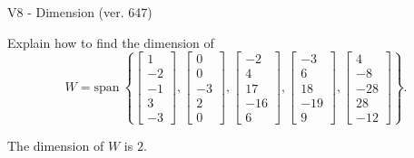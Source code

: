 \begin{exercise}
  \begin{exerciseTitle}V8 - Dimension (ver. 647)\end{exerciseTitle}
  \begin{exerciseStatement}
    Explain how to find the dimension of 
\[W=\mathrm{span}\ \left\{\left[\begin{array}{r}
1 \\
-2 \\
-1 \\
3 \\
-3
\end{array}\right] , \left[\begin{array}{r}
0 \\
0 \\
-3 \\
2 \\
0
\end{array}\right] , \left[\begin{array}{r}
-2 \\
4 \\
17 \\
-16 \\
6
\end{array}\right] , \left[\begin{array}{r}
-3 \\
6 \\
18 \\
-19 \\
9
\end{array}\right] , \left[\begin{array}{r}
4 \\
-8 \\
-28 \\
28 \\
-12
\end{array}\right]\right\}.\]



  \end{exerciseStatement}
  \begin{exerciseAnswer}
   The dimension of \(W\) is  \(2\).
  


  \end{exerciseAnswer}
\end{exercise}